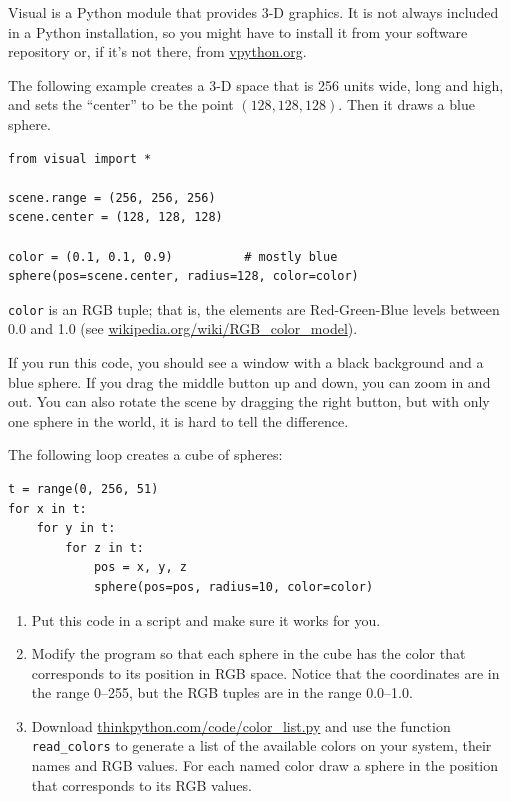 \documentclass[10pt]{book}
\begin{document}
{\begin{ex}
Visual is a Python module that provides 3-D graphics.  It is
not always included in a Python installation, so you might have
to install it from your software repository or, if it's not there,
from \url{vpython.org}.

The following example creates a 3-D space that is 256 units
wide, long and high, and sets the ``center'' to be the
point $(128, 128, 128)$.  Then it draws a blue sphere.

\beforeverb
\begin{verbatim}
from visual import *

scene.range = (256, 256, 256)
scene.center = (128, 128, 128)

color = (0.1, 0.1, 0.9)          # mostly blue
sphere(pos=scene.center, radius=128, color=color)
\end{verbatim}
\afterverb

{\tt color} is an RGB tuple; that is, the elements are Red-Green-Blue
levels between 0.0 and 1.0 (see
\url{wikipedia.org/wiki/RGB_color_model}).

If you run this code, you should see a window with a black
background and a blue sphere.  If you drag the middle button
up and down, you can zoom in and out.  You can also rotate
the scene by dragging the right button, but with only one
sphere in the world, it is hard to tell the difference.

The following loop creates a cube of spheres:

\beforeverb
\begin{verbatim}
t = range(0, 256, 51)
for x in t:
    for y in t:
        for z in t:
            pos = x, y, z
            sphere(pos=pos, radius=10, color=color)
\end{verbatim}
\afterverb

\begin{enumerate}

\item Put this code in a script and make sure it works for
you.

\item Modify the program so that each sphere in the cube
has the color that corresponds to its position in RGB space.
Notice that the coordinates are in the range 0--255, but
the RGB tuples are in the range 0.0--1.0.


\item Download \url{thinkpython.com/code/color_list.py}
and use the function \verb"read_colors" to generate a list
of the available colors on your system, their names and
RGB values.  For each named color draw a sphere in the
position that corresponds to its RGB values.




\end{enumerate}
\end{ex}}
\end{document}
